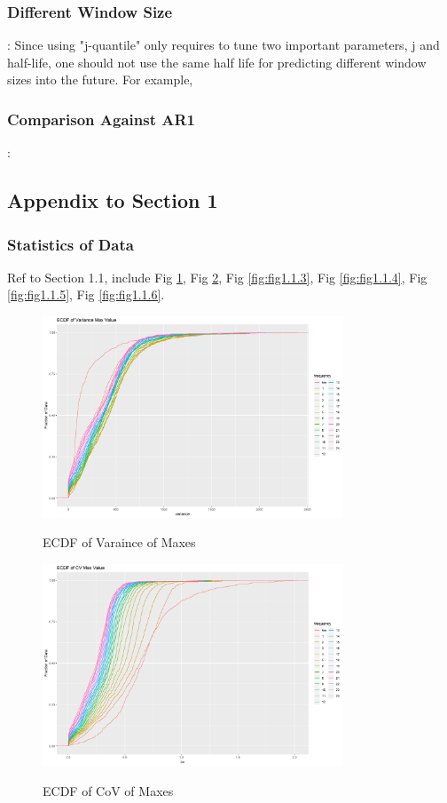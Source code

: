 \documentclass{article}
\begin{document}
\subsubsection{Different Window Size}:
Since using "j-quantile" only requires to tune two important parameters, j and half-life, one should not use the same half life for predicting different window sizes into the future. For example, 

\subsubsection{Comparison Against AR1}:

\subsection{Appendix to Section 1}

\subsubsection{Statistics of Data}

Ref to Section 1.1, include Fig \ref{fig:fig1.1.1}, Fig \ref{fig:fig1.1.2}, Fig \ref{fig:fig1.1.3}, Fig \ref{fig:fig1.1.4}, Fig \ref{fig:fig1.1.5}, Fig \ref{fig:fig1.1.6}.

\begin{figure}[htbp]
\caption{ECDF of Varaince of Maxes}
\centering
\includegraphics[width = 0.8\textwidth]{ECDFofVarianceMaxValue}
\label{fig:fig1.1.1}
\end{figure}

\begin{figure}[htbp]
\caption{ECDF of CoV of Maxes}
\centering
\includegraphics[width = 0.8\textwidth]{ECDFofCVMaxValue}
\label{fig:fig1.1.2}
\end{figure}
\end{document}
